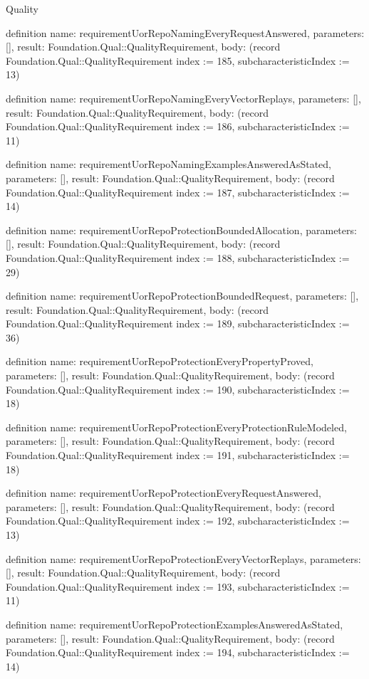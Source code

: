 \begin{lexlean}{Quality}
\begin{semanticmodule}
definition{
  name: requirementUorRepoNamingEveryRequestAnswered,
  parameters: [],
  result: Foundation.Qual::QualityRequirement,
  body: (record Foundation.Qual::QualityRequirement {index := 185, subcharacteristicIndex := 13})
}

definition{
  name: requirementUorRepoNamingEveryVectorReplays,
  parameters: [],
  result: Foundation.Qual::QualityRequirement,
  body: (record Foundation.Qual::QualityRequirement {index := 186, subcharacteristicIndex := 11})
}

definition{
  name: requirementUorRepoNamingExamplesAnsweredAsStated,
  parameters: [],
  result: Foundation.Qual::QualityRequirement,
  body: (record Foundation.Qual::QualityRequirement {index := 187, subcharacteristicIndex := 14})
}

definition{
  name: requirementUorRepoProtectionBoundedAllocation,
  parameters: [],
  result: Foundation.Qual::QualityRequirement,
  body: (record Foundation.Qual::QualityRequirement {index := 188, subcharacteristicIndex := 29})
}

definition{
  name: requirementUorRepoProtectionBoundedRequest,
  parameters: [],
  result: Foundation.Qual::QualityRequirement,
  body: (record Foundation.Qual::QualityRequirement {index := 189, subcharacteristicIndex := 36})
}

definition{
  name: requirementUorRepoProtectionEveryPropertyProved,
  parameters: [],
  result: Foundation.Qual::QualityRequirement,
  body: (record Foundation.Qual::QualityRequirement {index := 190, subcharacteristicIndex := 18})
}

definition{
  name: requirementUorRepoProtectionEveryProtectionRuleModeled,
  parameters: [],
  result: Foundation.Qual::QualityRequirement,
  body: (record Foundation.Qual::QualityRequirement {index := 191, subcharacteristicIndex := 18})
}

definition{
  name: requirementUorRepoProtectionEveryRequestAnswered,
  parameters: [],
  result: Foundation.Qual::QualityRequirement,
  body: (record Foundation.Qual::QualityRequirement {index := 192, subcharacteristicIndex := 13})
}

definition{
  name: requirementUorRepoProtectionEveryVectorReplays,
  parameters: [],
  result: Foundation.Qual::QualityRequirement,
  body: (record Foundation.Qual::QualityRequirement {index := 193, subcharacteristicIndex := 11})
}

definition{
  name: requirementUorRepoProtectionExamplesAnsweredAsStated,
  parameters: [],
  result: Foundation.Qual::QualityRequirement,
  body: (record Foundation.Qual::QualityRequirement {index := 194, subcharacteristicIndex := 14})
}


\end{semanticmodule}
\end{lexlean}
